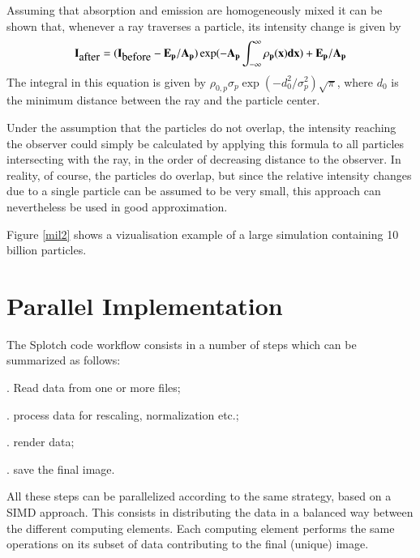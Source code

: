 Assuming that absorption and emission are homogeneously mixed it
can be shown that, whenever a ray traverses a particle, its intensity
change is given by
\begin{equation}
\label{i_change}
\bf{I}_{\mbox{after}}=(\bf{I}_{\mbox{before}}-\bf{E}_p/\bf{A}_p)
\exp(-\bf{A}_p\int_{-\infty}^\infty\rho_p(x)dx) + \bf{E}_p/\bf{A}_p
\end{equation}
The integral in this equation is given by
$\rho_{0,p}\sigma_p\exp{(-d_0^2/\sigma_p^2)}\sqrt{\pi}$, where $d_0$
is the minimum distance between the ray and the particle center.

Under the assumption that the particles do not overlap, the intensity
reaching the observer could simply be calculated by applying this formula to
all particles intersecting with the ray, in the order of decreasing distance
to the observer. In reality, of course, the particles do overlap, but since
the relative intensity changes due to a single particle can be assumed to be
very small, this approach can nevertheless be used in good approximation.

Figure \ref{mil2} shows a vizualisation example of a large simulation 
containing 10 billion particles.

\section{Parallel Implementation}
\label{parallel}

The Splotch code workflow consists in a number of steps which can be summarized as follows:

. Read data from one or more files;

. process data for rescaling, normalization etc.;

. render data;

. save the final image.

All these steps can be parallelized according to the same strategy, based on a SIMD approach. 
This consists in 
distributing the data in a balanced way between the different computing elements.
Each computing element performs the same operations on its subset of data contributing 
to the final (unique) image. 

